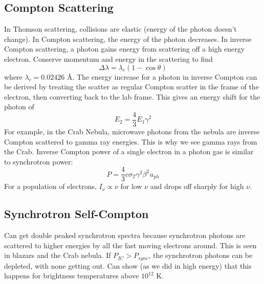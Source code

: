 \subsection{Compton Scattering}
In Thomson scattering, collisions are elastic (energy of the photon doesn't change).  In Compton 
scattering, the energy of the photon decreases.  In inverse Compton scattering, a photon gains 
energy from scattering off a high energy electron.  Conserve momentum and energy in the 
scattering to find
\begin{displaymath}\Delta \lambda=\lambda_c(1-\cos{\theta})\end{displaymath}
where $\lambda_c=0.02426$ \AA.
The energy increase for a photon in inverse Compton can be derived by treating the scatter as 
regular Compton scatter in the frame of the electron, then converting back to the lab frame.  
This gives an energy shift for the photon of 
\begin{displaymath}E_2=\frac{4}{3}E_1\gamma^2\end{displaymath}
For example, in the Crab Nebula, microwave photons from the nebula are inverse Compton scattered 
to gamma ray energies.  This is why we see gamma rays from the Crab.  Inverse Compton power 
of a single electron in a photon gas is similar to synchrotron power:
\begin{displaymath}\boxed{P=\frac{4}{3}c\sigma_T\gamma^2\beta^2u_{ph}}\end{displaymath}
For a population of electrons, $I_{\nu}\propto \nu$ for low $\nu$ and drops off sharply for 
high $\nu$.

\subsection{Synchrotron Self-Compton}
Can get double peaked synchrotron spectra because synchrotron photons are scattered to higher 
energies by all the fast moving electrons around.  This is seen in blazars and the Crab nebula.  
If $P_{IC}>P_{sync}$, the synchrotron photons can be depleted, with none getting out.  Can show 
(as we did in high energy) that this happens for brightness temperatures above $10^{12}$ K.

